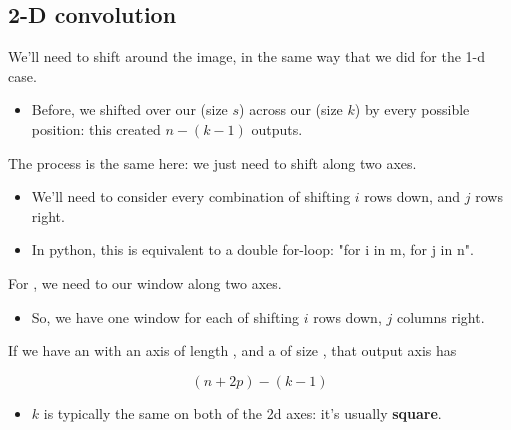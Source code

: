     \subsection{2-D convolution}

        We'll need to shift around the image, in the same way that we did for the 1-d case.

        \begin{itemize}
            \item Before, we shifted over our  (size $s$) across our  (size $k$) by every possible position: this created $n-(k-1)$ outputs.
        \end{itemize}

        The process is the same here: we just need to shift along two axes.

        \begin{itemize}
            \item We'll need to consider every combination of shifting $i$ rows down, and $j$ rows right.
            \item In python, this is equivalent to a double for-loop: "for i in m, for j in n".\\
        \end{itemize}

        \begin{concept}
            For , we need to  our window along two axes.

            \begin{itemize}
                \item So, we have one window for each  of shifting $i$ rows down, $j$ columns right.
            \end{itemize}

            If we have an  with an axis of length , and a  of size , that output axis has 

            \begin{equation*}
                (n+2p)-(k-1)
            \end{equation*}
            
            \begin{itemize}
                \item $k$ is typically the same on both of the 2d axes: it's usually \textbf{square}. 
            \end{itemize}
        \end{concept}

